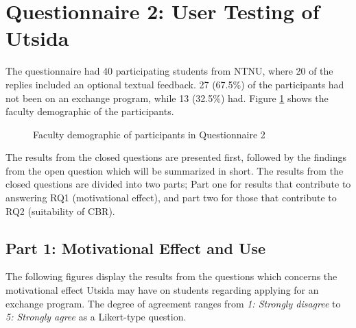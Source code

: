 \section{Questionnaire 2: User Testing of Utsida}

The questionnaire had 40 participating students from NTNU, where 20 of the replies included an optional textual feedback. 27 (67.5\%) of the participants had not been on an exchange program, while 13 (32.5\%) had. Figure \ref{fig:faculty_demographic} shows the faculty demographic of the participants.

\begin{figure}[h]
    \small
    \centering
    \caption{Faculty demographic of participants in Questionnaire 2}
    \label{fig:faculty_demographic}
\end{figure}

The results from the closed questions are presented first, followed by the findings from the open question which will be summarized in short. The results from the closed questions are divided into two parts; Part one for results that contribute to answering RQ1 (motivational effect), and part two for those that contribute to RQ2 (suitability of CBR).

\subsection{Part 1: Motivational Effect and Use}

The following figures display the results from the questions which concerns the motivational effect Utsida may have on students regarding applying for an exchange program. The degree of agreement ranges from \textit{1: Strongly disagree} to \textit{5: Strongly agree} as a Likert-type question.


